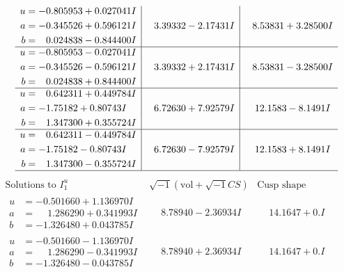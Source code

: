 \documentclass[1p]{elsarticle_modified}
\theoremstyle{definition}
\newcommand{\I}{\sqrt{-1}}
\begin{document}
$$\begin{array}{c|c|c}
\begin{aligned}
u &= -0.805953 + 0.027041 I \\
a &= -0.345526 + 0.596121 I \\
b &= \phantom{-}0.024838 - 0.844400 I\end{aligned}
 & \phantom{-}3.39332 - 2.17431 I & \phantom{-}8.53831 + 3.28500 I \\ \hline\begin{aligned}
u &= -0.805953 - 0.027041 I \\
a &= -0.345526 - 0.596121 I \\
b &= \phantom{-}0.024838 + 0.844400 I\end{aligned}
 & \phantom{-}3.39332 + 2.17431 I & \phantom{-}8.53831 - 3.28500 I \\ \hline\begin{aligned}
u &= \phantom{-}0.642311 + 0.449784 I \\
a &= -1.75182 + 0.80743 I \\
b &= \phantom{-}1.347300 + 0.355724 I\end{aligned}
 & \phantom{-}6.72630 + 7.92579 I & \phantom{-}12.1583 - 8.1491 I \\ \hline\begin{aligned}
u &= \phantom{-}0.642311 - 0.449784 I \\
a &= -1.75182 - 0.80743 I \\
b &= \phantom{-}1.347300 - 0.355724 I\end{aligned}
 & \phantom{-}6.72630 - 7.92579 I & \phantom{-}12.1583 + 8.1491 I\\
 \hline 
 \end{array}$$\newpage$$\begin{array}{c|c|c}  
\text{Solutions to }I^u_{1}& \I (\text{vol} + \sqrt{-1}CS) & \text{Cusp shape}\\
 \hline 
\begin{aligned}
u &= -0.501660 + 1.136970 I \\
a &= \phantom{-}1.286290 + 0.341993 I \\
b &= -1.326480 + 0.043785 I\end{aligned}
 & \phantom{-}8.78940 - 2.36934 I & \phantom{-}14.1647 + 0. I\phantom{ +0.000000I} \\ \hline\begin{aligned}
u &= -0.501660 - 1.136970 I \\
a &= \phantom{-}1.286290 - 0.341993 I \\
b &= -1.326480 - 0.043785 I\end{aligned}
 & \phantom{-}8.78940 + 2.36934 I & \phantom{-}14.1647 + 0. I\phantom{ +0.000000I} \\ \hline\begin{aligned}

\end{aligned}
\end{array}$$
\end{document}
